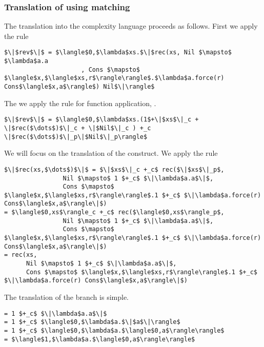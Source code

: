 \subsubsection*{Translation of  using matching}
The translation into the complexity language proceeds as follows.
First we apply the rule 
%
\begin{lstlisting}
$\|$rev$\|$ = $\langle$0,$\lambda$xs.$\|$rec(xs, Nil $\mapsto$ $\lambda$a.a
                     , Cons $\mapsto$ $\langle$x,$\langle$xs,r$\rangle\rangle$.$\lambda$a.force(r) Cons$\langle$x,a$\rangle$) Nil$\|\rangle$
\end{lstlisting}
%
The we apply the rule for function application, .
%
\begin{lstlisting}
$\|$rev$\|$ = $\langle$0,$\lambda$xs.(1$+\|$xs$\|_c + \|$rec($\dots$)$\|_c + \|$Nil$\|_c ) +_c \|$rec($\dots$)$\|_p\|$Nil$\|_p\rangle$
\end{lstlisting}
%
We will focus on the translation of the  construct.
We apply the rule 
%
\begin{lstlisting}
$\|$rec(xs,$\dots$)$\|$ = $\|$xs$\|_c +_c$ rec($\|$xs$\|_p$,
                Nil $\mapsto$ 1 $+_c$ $\|\lambda$a.a$\|$,
                Cons $\mapsto$ $\langle$x,$\langle$xs,r$\rangle\rangle$.1 $+_c$ $\|\lambda$a.force(r) Cons$\langle$x,a$\rangle\|$)
= $\langle$0,xs$\rangle_c +_c$ rec($\langle$0,xs$\rangle_p$,
                Nil $\mapsto$ 1 $+_c$ $\|\lambda$a.a$\|$,
                Cons $\mapsto$ $\langle$x,$\langle$xs,r$\rangle\rangle$.1 $+_c$ $\|\lambda$a.force(r) Cons$\langle$x,a$\rangle\|$)
= rec(xs,
      Nil $\mapsto$ 1 $+_c$ $\|\lambda$a.a$\|$,
      Cons $\mapsto$ $\langle$x,$\langle$xs,r$\rangle\rangle$.1 $+_c$ $\|\lambda$a.force(r) Cons$\langle$x,a$\rangle\|$)
\end{lstlisting}

The translation of the  branch is simple.
%
\begin{lstlisting}
= 1 $+_c$ $\|\lambda$a.a$\|$
= 1 $+_c$ $\langle$0,$\lambda$a.$\|$a$\|\rangle$
= 1 $+_c$ $\langle$0,$\lambda$a.$\langle$0,a$\rangle\rangle$
= $\langle$1,$\lambda$a.$\langle$0,a$\rangle\rangle$
\end{lstlisting}
%

